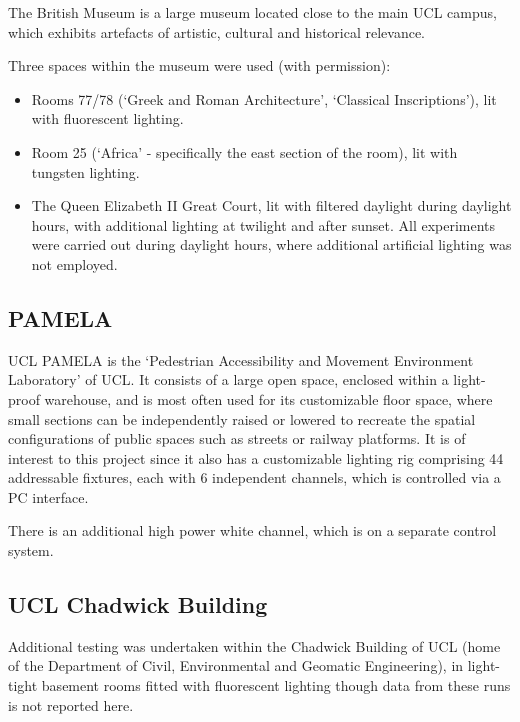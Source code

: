 The British Museum is a large museum located close to the main UCL campus, which exhibits artefacts of artistic, cultural and historical relevance. 

Three spaces within the museum were used (with permission):

\begin{itemize}
    \item Rooms 77/78 (`Greek and Roman Architecture', `Classical Inscriptions'), lit with fluorescent lighting.
    \item Room 25 (`Africa' - specifically the east section of the room), lit with tungsten  lighting.
    \item The Queen Elizabeth II Great Court, lit with filtered daylight \cite{foster_and_partners_london._great_2002} during daylight hours, with additional lighting at twilight and after sunset. All experiments were carried out during daylight hours, where additional artificial lighting was not employed.
\end{itemize}



\subsection*{PAMELA}

UCL PAMELA is the `Pedestrian Accessibility and Movement Environment Laboratory' of UCL. It consists of a large open space, enclosed within a light-proof warehouse, and is most often used for its customizable floor space, where small sections can be independently raised or lowered to recreate the spatial configurations of public spaces such as streets or railway platforms. It is of interest to this project since it also has a customizable lighting rig comprising 44 addressable fixtures, each with 6 independent channels, which is controlled via a PC interface. 


There is an additional high power white channel, which is on a separate control system. 


\subsection*{UCL Chadwick Building}

Additional testing was undertaken within the Chadwick Building of UCL (home of the Department of Civil, Environmental and Geomatic Engineering), in light-tight basement rooms fitted with fluorescent lighting though data from these runs is not reported here.

